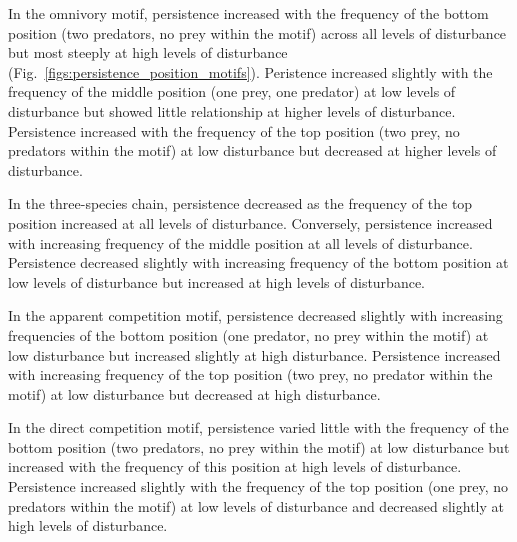 \documentclass[12pt]{article}
\begin{document}
\begin{spacing}{2.0}
        In the omnivory motif, persistence increased with the frequency of the bottom position (two predators, no prey within the motif) across all levels of disturbance but most steeply at high levels of disturbance (Fig.~\ref{figs:persistence_position_motifs}).
        Peristence increased slightly with the frequency of the middle position (one prey, one predator) at low levels of disturbance but showed little relationship at higher levels of disturbance.
        Persistence increased with the frequency of the top position (two prey, no predators within the motif) at low disturbance but decreased at higher levels of disturbance.
        
        
        In the three-species chain, persistence decreased as the frequency of the top position increased at all levels of disturbance.
        Conversely, persistence increased with increasing frequency of the middle position at all levels of disturbance.
        Persistence decreased slightly with increasing frequency of the bottom position at low levels of disturbance but increased at high levels of disturbance.
        
        
        In the apparent competition motif, persistence decreased slightly with increasing frequencies of the bottom position (one predator, no prey within the motif) at low disturbance but increased slightly at high disturbance.
        Persistence increased with increasing frequency of the top position (two prey, no predator within the motif) at low disturbance but decreased at high disturbance.
        
        
        In the direct competition motif, persistence varied little with the frequency of the bottom position (two predators, no prey within the motif) at low disturbance but increased with the frequency of this position at high levels of disturbance.
        Persistence increased slightly with the frequency of the top position (one prey, no predators within the motif) at low levels of disturbance and decreased slightly at high levels of disturbance.
        

\end{spacing}
\end{document}
